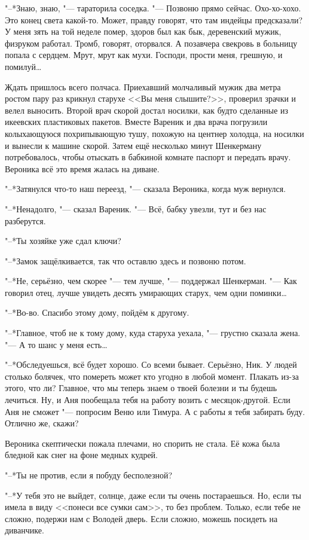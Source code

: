"--*Знаю, знаю, "--- тараторила соседка.
"--- Позвоню прямо сейчас.
Охо-хо-хохо.
Это конец света какой-то.
Может, правду говорят, что там индейцы предсказали?
У меня зять на той неделе помер, здоров был как бык, деревенский мужик, физруком работал.
Тромб, говорят, оторвался.
А позавчера свекровь в больницу попала с сердцем.
Мрут, мрут как мухи.
Господи, прости меня, грешную, и помилуй\ldots{}

Ждать пришлось всего полчаса.
Приехавший молчаливый мужик два метра ростом пару раз крикнул старухе <<Вы меня слышите?>>, проверил зрачки и велел выносить.
Второй врач скорой достал носилки, как будто сделанные из икеевских пластиковых пакетов.
Вместе Вареник и два врача погрузили колыхающуюся похрипывающую тушу, похожую на центнер холодца, на носилки и вынесли к машине скорой.
Затем ещё несколько минут Шенкерману потребовалось, чтобы отыскать в бабкиной комнате паспорт и передать врачу.
Вероника всё это время жалась на диване.

"--*Затянулся что-то наш переезд, "--- сказала Вероника, когда муж вернулся.

"--*Ненадолго, "--- сказал Вареник.
"--- Всё, бабку увезли, тут и без нас разберутся.

"--*Ты хозяйке уже сдал ключи?

"--*Замок защёлкивается, так что оставлю здесь и позвоню потом.

"--*Не, серьёзно, чем скорее "--- тем лучше, "--- поддержал Шенкерман.
"--- Как говорил отец, лучше увидеть десять умирающих старух, чем одни поминки\ldots{}

"--*Во-во.
Спасибо этому дому, пойдём к другому.

"--*Главное, чтоб не к тому дому, куда старуха уехала, "--- грустно сказала жена.
"--- А то шанс у меня есть\ldots{}

"--*Обследуешься, всё будет хорошо.
Со всеми бывает.
Серьёзно, Ник.
У людей столько болячек, что помереть может кто угодно в любой момент.
Плакать из-за этого, что ли?
Главное, что мы теперь знаем о твоей болезни и ты будешь лечиться.
Ну, и Аня пообещала тебя на работу возить с месяцок-другой.
Если Аня не сможет "--- попросим Веню или Тимура.
А с работы я тебя забирать буду.
Отлично же, скажи?

Вероника скептически пожала плечами, но спорить не стала.
Её кожа была бледной как снег на фоне медных кудрей.

"--*Ты не против, если я побуду бесполезной?

"--*У тебя это не выйдет, солнце, даже если ты очень постараешься.
Но, если ты имела в виду <<понеси все сумки сам>>, то без проблем.
Только, если тебе не сложно, подержи нам с Володей дверь.
Если сложно, можешь посидеть на диванчике.

